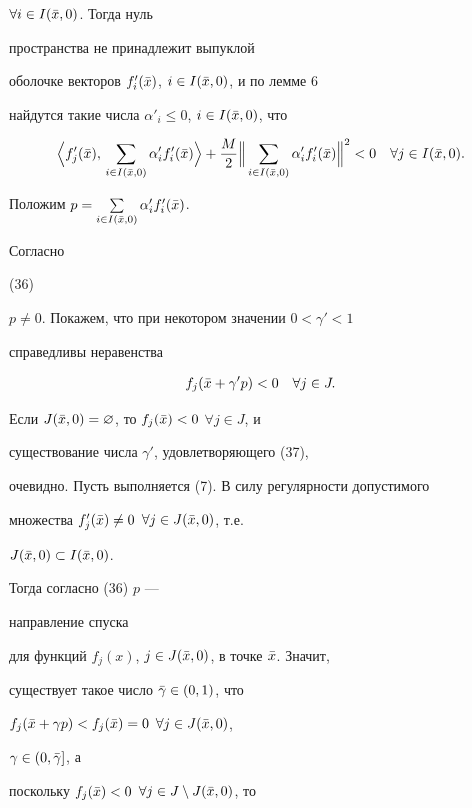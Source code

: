 \begin{pf}
$\forall i\in I(\Bar x,0)$. Тогда нуль


пространства не принадлежит выпуклой


оболочке векторов $f'_i(\Bar x)$, $i\in I(\Bar x,0)$, и по лемме 6


найдутся такие числа $\alpha'_i\le 0$, $i\in I(\Bar x,0)$, что


\begin{equation}


\Bigl\la f'_j(\Bar x),\,\sum_{i\in I(\Bar x,0)}\alpha'_if'_i(\Bar x)


\Bigr\ra +\frac{M}{2}\Bigl\|\,


\sum_{i\in I(\Bar x,0)}\alpha'_if'_i(\Bar x)\Bigr\|^2<0\quad


\forall j\in I(\Bar x,0).


\end{equation}


Положим $p=\sum\limits_{i\in I(\Bar x,0)}\alpha'_if'_i(\Bar x)$.


Согласно


(36)


$p\ne 0$. Покажем, что при некотором значении $0<\gamma'<1$


справедливы неравенства


\begin{equation}


f_j(\Bar x+\gamma'p)<0\quad \forall j\in J.


\end{equation}


Если $J(\Bar x,0)=\varnothing$, то $f_j(\Bar x)<0$ $\forall j\in J$, и


существование числа $\gamma'$, удовлетворяющего (37),


очевидно. Пусть выполняется (7). В силу регулярности допустимого


множества $f'_j(\Bar x)\ne 0$ $\forall j\in J(\Bar x,0)$, т.е.


$J(\Bar x,0)\subset I(\Bar x,0)$.


Тогда согласно (36) $p$ ---


направление спуска


для функций $f_j(x)$, $j\in J(\Bar x,0)$, в точке $\Bar x$. Значит,


существует такое число $\Bar\gamma\in (0,1)$, что


$f_j(\Bar x+\gamma p)<f_j(\Bar x)=0$ $\forall j\in J(\Bar x,0)$,


$\gamma\in(0,\Bar\gamma]$, а


поскольку $f_j(\Bar x)<0$ $\forall j\in J\setminus J(\Bar x,0)$, то



\end{pf}
